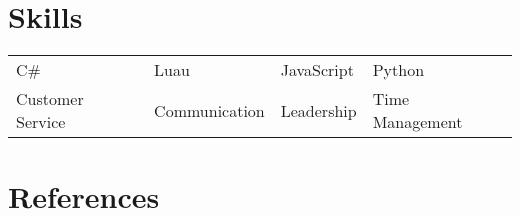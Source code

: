 \documentclass{my_cv}
\begin{document}
\section{Skills}
\begin{tabular}{l l l l}
    C\# & Luau & JavaScript & Python \\
    Customer Service & Communication & Leadership & Time Management
\end{tabular}

\section{References}
\end{document}
